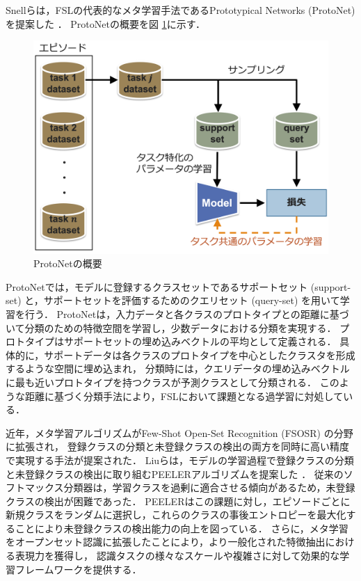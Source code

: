 Snellらは，FSLの代表的なメタ学習手法であるPrototypical Networks (ProtoNet) を提案した \cite{protonet}．
ProtoNetの概要を図 \ref{fig:protonet}に示す．
% 
\begin{figure}[tbp]
  \centering
  \includegraphics[width=0.7\linewidth, keepaspectratio]{image/protonet.png}
  \caption{ProtoNetの概要}
  \label{fig:protonet}
\end{figure}
% 
ProtoNetでは，モデルに登録するクラスセットであるサポートセット (support-set) と，サポートセットを評価するためのクエリセット (query-set) を用いて学習を行う．
ProtoNetは，入力データと各クラスのプロトタイプとの距離に基づいて分類のための特徴空間を学習し，少数データにおける分類を実現する．
プロトタイプはサポートセットの埋め込みベクトルの平均として定義される．
具体的に，サポートデータは各クラスのプロトタイプを中心としたクラスタを形成するような空間に埋め込まれ，
分類時には，クエリデータの埋め込みベクトルに最も近いプロトタイプを持つクラスが予測クラスとして分類される．
このような距離に基づく分類手法により，FSLにおいて課題となる過学習に対処している．

近年，メタ学習アルゴリズムがFew-Shot Open-Set Recognition (FSOSR) の分野に拡張され，
登録クラスの分類と未登録クラスの検出の両方を同時に高い精度で実現する手法が提案された．
Liuらは，モデルの学習過程で登録クラスの分類と未登録クラスの検出に取り組むPEELERアルゴリズムを提案した \cite{peeler}．
従来のソフトマックス分類器は，学習クラスを過剰に適合させる傾向があるため，未登録クラスの検出が困難であった．
PEELERはこの課題に対し，エピソードごとに新規クラスをランダムに選択し，これらのクラスの事後エントロピーを最大化することにより未登録クラスの検出能力の向上を図っている．
さらに，メタ学習をオープンセット認識に拡張したことにより，より一般化された特徴抽出における表現力を獲得し，
認識タスクの様々なスケールや複雑さに対して効果的な学習フレームワークを提供する．

